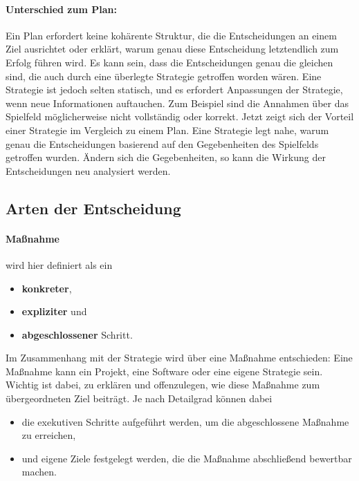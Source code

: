\paragraph{Unterschied zum Plan:} Ein Plan erfordert keine kohärente Struktur, die die Entscheidungen an einem Ziel ausrichtet oder erklärt, warum genau diese Entscheidung letztendlich zum Erfolg führen wird. Es kann sein, dass die Entscheidungen genau die gleichen sind, die auch durch eine überlegte Strategie getroffen worden wären. Eine Strategie ist jedoch selten statisch, und es erfordert Anpassungen der Strategie, wenn neue Informationen auftauchen. Zum Beispiel sind die Annahmen über das Spielfeld möglicherweise nicht vollständig oder korrekt. Jetzt zeigt sich der Vorteil einer Strategie im Vergleich zu einem Plan. Eine Strategie legt nahe, warum genau die Entscheidungen basierend auf den Gegebenheiten des Spielfelds getroffen wurden. Ändern sich die Gegebenheiten, so kann die Wirkung der Entscheidungen neu analysiert werden.

\subsection{Arten der Entscheidung}


\paragraph{Maßnahme} wird hier definiert als ein

\begin{itemize}
	\item \textbf{konkreter},
	\item \textbf{expliziter} und
	\item \textbf{abgeschlossener} Schritt.
\end{itemize}

Im Zusammenhang mit der Strategie wird über eine Maßnahme entschieden: Eine Maßnahme kann ein Projekt, eine Software oder eine eigene Strategie sein. Wichtig ist dabei, zu erklären und offenzulegen, wie diese Maßnahme zum übergeordneten Ziel beiträgt. Je nach Detailgrad können dabei

\begin{itemize}
	\item die exekutiven Schritte aufgeführt werden, um die abgeschlossene Maßnahme zu erreichen,
	\item und eigene Ziele festgelegt werden, die die Maßnahme abschließend bewertbar machen.
\end{itemize}


